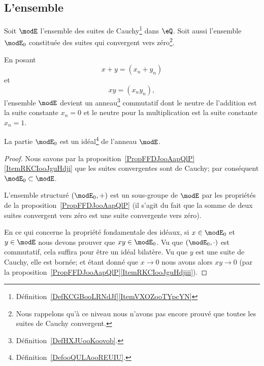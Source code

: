 \subsection{L'ensemble}

Soit \( \modE\) l'ensemble des suites de Cauchy\footnote{Définition~\ref{DefKCGBooLRNdJf}\ref{ItemVXOZooTYpcYN}} dans \( \eQ\). Soit aussi l'ensemble \( \modE_0\) constituée des suites qui convergent vers zéro\footnote{Nous rappelons qu'à ce niveau nous n'avons pas encore prouvé que toutes les suites de Cauchy convergent.}.

En posant
\begin{equation}
    x+y=(x_n+y_n)
\end{equation}
et
\begin{equation}
    xy=(x_ny_n),
\end{equation}
l'ensemble \( \modE\) devient un anneau\footnote{Définition~\ref{DefHXJUooKoovob}.} commutatif dont le neutre de l'addition est la suite constante \( x_n=0\) et le neutre pour la multiplication est la suite constante \( x_n=1\).

\begin{proposition}
    La partie \( \modE_0\) est un idéal\footnote{Définition~\ref{DefooQULAooREUIU}.} de l'anneau \( \modE\).
\end{proposition}

\begin{proof}
    Nous savons par la proposition~\ref{PropFFDJooAapQlP}\ref{ItemRKCIooJguHdji} que les suites convergentes sont de Cauchy; par conséquent \( \modE_0\subset\modE\).

    L'ensemble structuré \( (\modE_0,+)\) est un sous-groupe de \( \modE\) par les propriétés de la proposition~\ref{PropFFDJooAapQlP} (il s'agit du fait que la somme de deux suites convergent vers zéro est une suite convergente vers zéro).

    En ce qui concerne la propriété fondamentale des idéaux, si \( x\in\modE_0\) et \( y\in\modE\) nous devons prouver que \( xy\in \modE_0\). Vu que \( (\modE_0,\cdot)\) est commutatif, cela suffira pour être un idéal bilatère. Vu que \( y\) est une suite de Cauchy, elle est bornée; et étant donné que \( x\to 0\) nous avons alors \( xy\to 0\) (par la proposition~\ref{PropFFDJooAapQlP}\ref{ItemRKCIooJguHdjiii}).
\end{proof}

